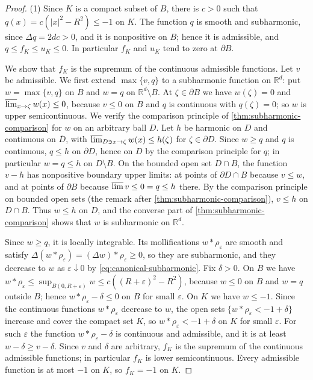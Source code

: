 \begin{proof}
(1) Since $K$ is a compact subset of $B$, there is $c>0$ such that $q(x)=c(|x|^2-R^2)\leq-1$ on $K$. The function $q$ is smooth and subharmonic, since $\Delta q=2dc>0$, and it is nonpositive on $B$; hence it is admissible, and $q\leq f_K\leq u_K\leq0$. In particular $f_K$ and $u_K$ tend to zero at $\partial B$.

We show that $f_K$ is the supremum of the continuous admissible functions. Let $v$ be admissible. We first extend $\max\{v,q\}$ to a subharmonic function on $\mathbb R^d$: put $w=\max\{v,q\}$ on $B$ and $w=q$ on $\mathbb R^d\setminus B$. At $\zeta\in\partial B$ we have $w(\zeta)=0$ and $\varlimsup_{x\to\zeta}w(x)\leq0$, because $v\leq0$ on $B$ and $q$ is continuous with $q(\zeta)=0$; so $w$ is upper semicontinuous. We verify the comparison principle of \cref{thm:subharmonic-comparison} for $w$ on an arbitrary ball $D$. Let $h$ be harmonic on $D$ and continuous on $\overline D$, with $\varlimsup_{D\ni x\to\zeta}w(x)\leq h(\zeta)$ for $\zeta\in\partial D$. Since $w\geq q$ and $q$ is continuous, $q\leq h$ on $\partial D$, hence on $D$ by the comparison principle for $q$; in particular $w=q\leq h$ on $D\setminus B$. On the bounded open set $D\cap B$, the function $v-h$ has nonpositive boundary upper limits: at points of $\partial D\cap B$ because $v\leq w$, and at points of $\partial B$ because $\varlimsup v\leq0=q\leq h$ there. By the comparison principle on bounded open sets (the remark after \cref{thm:subharmonic-comparison}), $v\leq h$ on $D\cap B$. Thus $w\leq h$ on $D$, and the converse part of \cref{thm:subharmonic-comparison} shows that $w$ is subharmonic on $\mathbb R^d$.

Since $w\geq q$, it is locally integrable. Its mollifications $w*\rho_\varepsilon$ are smooth and satisfy $\Delta(w*\rho_\varepsilon)=(\Delta w)*\rho_\varepsilon\geq0$, so they are subharmonic, and they decrease to $w$ as $\varepsilon\downarrow0$ by \eqref{eq:canonical-subharmonic}. Fix $\delta>0$. On $B$ we have $w*\rho_\varepsilon\leq\sup_{B(0,R+\varepsilon)}w\leq c((R+\varepsilon)^2-R^2)$, because $w\leq0$ on $B$ and $w=q$ outside $B$; hence $w*\rho_\varepsilon-\delta\leq0$ on $B$ for small $\varepsilon$. On $K$ we have $w\leq-1$. Since the continuous functions $w*\rho_\varepsilon$ decrease to $w$, the open sets $\{w*\rho_\varepsilon<-1+\delta\}$ increase and cover the compact set $K$, so $w*\rho_\varepsilon<-1+\delta$ on $K$ for small $\varepsilon$. For such $\varepsilon$ the function $w*\rho_\varepsilon-\delta$ is continuous and admissible, and it is at least $w-\delta\geq v-\delta$. Since $v$ and $\delta$ are arbitrary, $f_K$ is the supremum of the continuous admissible functions; in particular $f_K$ is lower semicontinuous. Every admissible function is at most $-1$ on $K$, so $f_K=-1$ on $K$.


\end{proof}
